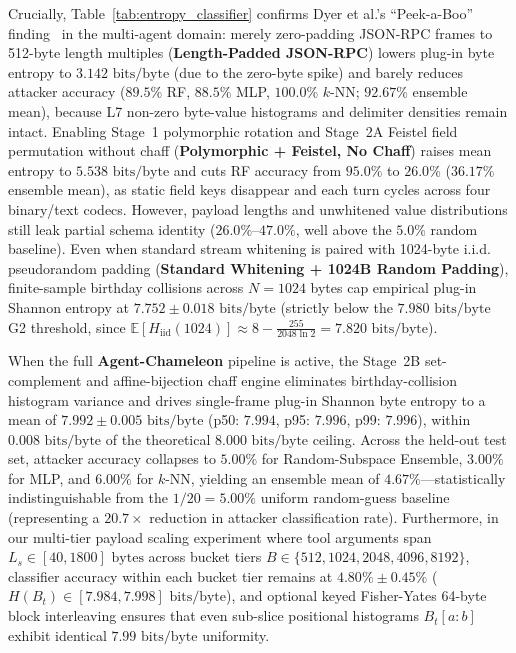 \documentclass[conference,10pt]{IEEEtran}
\begin{document}
Crucially, Table~\ref{tab:entropy_classifier} confirms Dyer et al.'s ``Peek-a-Boo'' finding~\cite{dyer2012peekaboo} in the multi-agent domain: merely zero-padding JSON-RPC frames to 512-byte length multiples (\textbf{Length-Padded JSON-RPC}) lowers plug-in byte entropy to $3.142\text{ bits/byte}$ (due to the zero-byte spike) and barely reduces attacker accuracy ($89.5\%$ RF, $88.5\%$ MLP, $100.0\%$ $k$-NN; $92.67\%$ ensemble mean), because L7 non-zero byte-value histograms and delimiter densities remain intact. Enabling Stage~1 polymorphic rotation and Stage~2A Feistel field permutation without chaff (\textbf{Polymorphic + Feistel, No Chaff}) raises mean entropy to $5.538\text{ bits/byte}$ and cuts RF accuracy from $95.0\%$ to $26.0\%$ ($36.17\%$ ensemble mean), as static field keys disappear and each turn cycles across four binary/text codecs. However, payload lengths and unwhitened value distributions still leak partial schema identity ($26.0\%$--$47.0\%$, well above the $5.0\%$ random baseline). Even when standard stream whitening is paired with 1024-byte i.i.d. pseudorandom padding (\textbf{Standard Whitening + 1024B Random Padding}), finite-sample birthday collisions across $N=1024$ bytes cap empirical plug-in Shannon entropy at $7.752 \pm 0.018\text{ bits/byte}$ (strictly below the $7.980\text{ bits/byte}$ G2 threshold, since $\mathbb{E}[H_{\text{iid}}(1024)] \approx 8 - \frac{255}{2048\ln 2} = 7.820\text{ bits/byte}$).

When the full \textbf{Agent-Chameleon} pipeline is active, the Stage~2B set-complement and affine-bijection chaff engine eliminates birthday-collision histogram variance and drives single-frame plug-in Shannon byte entropy to a mean of $7.992 \pm 0.005\text{ bits/byte}$ (p50: $7.994$, p95: $7.996$, p99: $7.996$), within $0.008\text{ bits/byte}$ of the theoretical $8.000\text{ bits/byte}$ ceiling. Across the held-out test set, attacker accuracy collapses to $5.00\%$ for Random-Subspace Ensemble, $3.00\%$ for MLP, and $6.00\%$ for $k$-NN, yielding an ensemble mean of $4.67\%$---statistically indistinguishable from the $1/20 = 5.00\%$ uniform random-guess baseline (representing a $20.7\times$ reduction in attacker classification rate). Furthermore, in our multi-tier payload scaling experiment where tool arguments span $L_s \in [40, 1800]\text{ bytes}$ across bucket tiers $B \in \{512, 1024, 2048, 4096, 8192\}$, classifier accuracy within each bucket tier remains at $4.80\% \pm 0.45\%$ ($H(B_t) \in [7.984, 7.998]\text{ bits/byte}$), and optional keyed Fisher-Yates 64-byte block interleaving ensures that even sub-slice positional histograms $B_t[a:b]$ exhibit identical $7.99\text{ bits/byte}$ uniformity.
\end{document}
